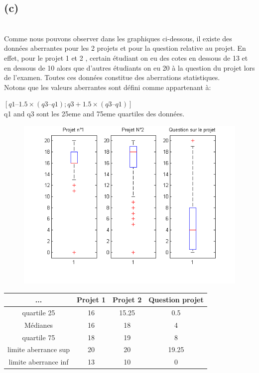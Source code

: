 \documentclass[10pt,a4paper]{article}
\begin{document}
\subsection*{(c)}
\ \\ 

Comme nous pouvons observer dans les graphiques ci-dessous, il existe des données aberrantes pour les 2 projets et pour la question relative au projet. En effet, pour le projet 1 et 2 , certain étudiant on eu des cotes en dessous de 13 et en dessous de 10 alors que d'autres étudiants on eu 20 à la question du projet lors de l'examen. Toutes ces données constitue des aberrations statistiques.
\ \\

Notons que les valeurs aberrantes sont défini comme appartenant à:
\begin{center}
$[ q1 – 1.5 \times (q3 – q1) ; q3 + 1.5 \times (q3 – q1) ]$\\
 q1 and q3 sont les 25eme and 75eme quartiles des données.
\end{center}

\begin{figure}[h]
\centering
\includegraphics[scale= 0.5]{1c_graphe.png}
\end{figure}
 
\begin{center}
\begin{tabular}{|c|c|c|c|}
\hline
... & Projet 1 & Projet 2 & Question projet \\
\hline
\hline
quartile 25 & 16 & 15.25 & 0.5 \\
\hline
Médianes & 16 & 18 & 4 \\
\hline
quartile 75 & 18 & 19 & 8 \\
\hline
limite aberrance sup & 20 & 20 & 19.25 \\
\hline
limite aberrance inf & 13 & 10 & 0 \\
\hline


\end{tabular}
\end{center}
\ \\
 
\end{document}
